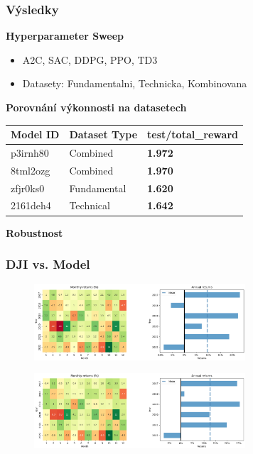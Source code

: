 \begin{frame}
    \frametitle{Výsledky}
    \textbf{Hyperparameter Sweep}
    \begin{itemize}
        \item A2C, SAC, DDPG, PPO, TD3
        \item Datasety: Fundamentalni, Technicka, Kombinovana
    \end{itemize}
    \textbf{Porovnání výkonnosti na datasetech}
    \begin{table}[H]
        \centering
        {\footnotesize
            \begin{tabular}{|l|l|l|}
                \hline
                \textbf{Model ID} & \textbf{Dataset Type} & \textbf{test/total\_reward}                \\ \hline
                p3irnh80          & Combined              & \textcolor[RGB]{50,150,50}{\textbf{1.972}} \\ \hline
                8tml2ozg          & Combined              & \textcolor[RGB]{50,150,50}{\textbf{1.970}} \\ \hline
                \midrule
                \midrule
                zfjr0ks0          & Fundamental           & \textcolor[RGB]{150,50,50}{\textbf{1.620}} \\ \hline
                2161deh4          & Technical             & \textcolor[RGB]{150,50,50}{\textbf{1.642}} \\ \hline
            \end{tabular}
        }
        \label{tab:datasets-comparison}
    \end{table}
    \textbf{Robustnost}
\end{frame}

\begin{frame}
    \frametitle{DJI vs. Model}
    \begin{figure}
        \centering
        \includegraphics[width=0.7\textwidth]{img/dji-month-year}
    \end{figure}
    \begin{figure}
        \centering
        \includegraphics[width=0.7\textwidth]{img/model-month-year}
    \end{figure}
\end{frame}

